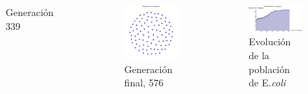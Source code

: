 \documentclass{beamer}
\begin{document}
\begin{frame}
\begin{columns}[c]
\begin{figure}[ht!]
\caption{Generación 339}
\end{figure} 
\begin{figure}[ht!]
\vspace*{-1cm}
\includegraphics[scale=0.2]{ecoli_moran_576.png} 
\caption{Generación final, 576}
\end{figure} 
\begin{figure}[ht!]
\vspace*{-1cm}
\includegraphics[scale=0.2]{poblacion_ecoli_trans.png} 
\caption{Evolución de la población de E.\textit{coli}}
\end{figure} 
\end{columns}
\end{frame}

\end{document}
